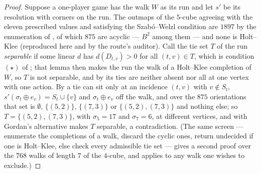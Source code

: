 \documentclass[11pt]{article}
\theoremstyle{plain}
\theoremstyle{definition}
\begin{document}
\begin{proof}
Suppose a one-player game has the walk $W$ as its run and let $s'$ be its
resolution with corners on the run. The outmaps of the $5$-cube agreeing
with the eleven prescribed values and satisfying the Szab\'o--Welzl
condition are $1897$ by the enumeration of , of which
$875$ are acyclic --- $B^{2}$ among them --- and none is Holt--Klee
(reproduced here and by the route's auditor). Call the tie set $T$ of the run \emph{separable} if some linear $d$
has $d(D_{t,v})>0$ for all $(t,v)\in T$, which is condition $(\star)$ of
; that lemma then makes the run the walk of a
Holt--Klee completion of $W$, so $T$ is not separable, and by
 its ties are neither absent nor all at one vertex with
one action. By  a tie can sit only at an
incidence $(t,v)$ with $v\notin S_t$, $s'(\sigma_t\oplus e_v)=S_t\cup\{v\}$
and $\sigma_t\oplus e_v$ off the walk, and over the $875$ orientations
that set is $\emptyset$, $\{(5,2)\}$, $\{(7,3)\}$ or $\{(5,2),(7,3)\}$
and nothing else; so $T=\{(5,2),(7,3)\}$, with $\sigma_5=17$ and
$\sigma_7=6$, at different vertices, and  with
Gordan's alternative makes $T$ separable, a contradiction. (The same screen --- enumerate the
completions of a walk, discard the cyclic ones, return undecided if one
is Holt--Klee, else check every admissible tie set --- gives
 a second proof over the $768$ walks of length $7$ of
the $4$-cube, and applies to any walk one wishes to exclude.)
\end{proof}
\end{document}
